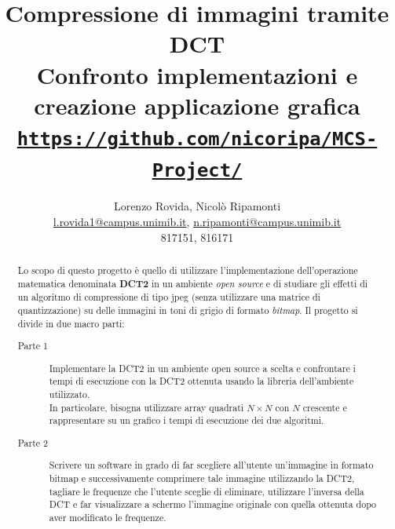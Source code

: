 \documentclass[preprint,12pt]{elsarticle}
\begin{document}
	

\begin{frontmatter}

\title{Compressione di immagini tramite DCT\\
\large{Confronto implementazioni e creazione applicazione grafica}
\vspace{5mm}\\ \normalsize{\texttt{\href{https://github.com/nicoripa/MCS-Project/}{https://github.com/nicoripa/MCS-Project/}}}}

\author{Lorenzo Rovida, Nicolò Ripamonti\\
	\small{ \href{mailto:l.rovida1@campus.unimib.it}{l.rovida1@campus.unimib.it},  \href{mailto:n.ripamonti@campus.unimib.it}{n.ripamonti@campus.unimib.it}\\817151, 816171}}

\address{Dipartimento di Informatica, Sistemi e Comunicazione, Universitá degli Studi di Milano-Bicocca, Milano, Italia}


\begin{abstract}
Lo scopo di questo progetto è quello di utilizzare l’implementazione dell'operazione matematica denominata \textbf{DCT2} in un ambiente \textit{open source} e di studiare gli effetti di un algoritmo di compressione di tipo jpeg (senza utilizzare una matrice di quantizzazione) su delle immagini in toni di grigio di formato \textit{bitmap}.
Il progetto si divide in due macro parti:
\begin{description}
\item[Parte 1] Implementare la DCT2  in un ambiente open source a scelta e confrontare i tempi di esecuzione con la DCT2 ottenuta usando la libreria dell’ambiente utilizzato. \\
In particolare, bisogna utilizzare array quadrati $N \times N$ con $N$ crescente e rappresentare su un grafico i tempi di esecuzione dei due algoritmi.
\item[Parte 2] Scrivere un software in grado di far scegliere all'utente un'immagine in formato bitmap e successivamente comprimere tale immagine utilizzando la DCT2, tagliare le frequenze che l'utente sceglie di eliminare, utilizzare l'inversa della DCT e far visualizzare a schermo l'immagine originale con quella ottenuta dopo aver modificato le frequenze.
\end{description}
\end{abstract}

\end{frontmatter}
\end{document}
